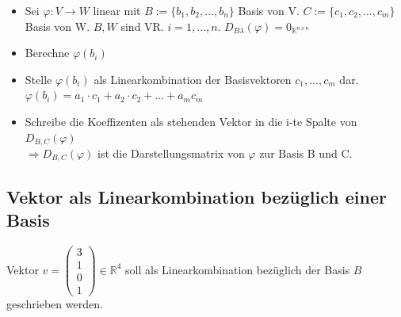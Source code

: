 \documentclass{scrartcl}
\begin{document}
\begin{itemize}
\item Sei $\varphi: V \rightarrow W$ linear mit $B := \{b_1, b_2, \dots, b_n\}$ Basis von V. $C := \{c_1, c_2, \dots, c_m\}$ Basis von W. $B, W$ sind VR. $i = 1, \dots, n$. $D_{B\lambda}(\varphi) = 0_{\mathbb{K}^{n~x~n}}$
\item Berechne $\varphi(b_i)$
\item Stelle $\varphi(b_i)$ als Linearkombination der Basisvektoren $c_1, \dots, c_m$ dar.\\
$\varphi(b_i) = a_1 \cdot c_1 + a_2 \cdot c_2 + \dots + a_m c_m$
\item Schreibe die Koeffizenten als stehenden Vektor in die i-te Spalte von $D_{B,C} (\varphi)$\\
$\Rightarrow D_{B,C} (\varphi)$ ist die Darstellungsmatrix von $\varphi$ zur Basis B und C.
\end{itemize}

\subsection{Vektor als Linearkombination bezüglich einer Basis} \label{Linearkombination}

Vektor $v = \begin{pmatrix} 3 \\ 1 \\ 0\\ 1 \end{pmatrix} \in \mathbb{R}^4$ soll als Linearkombination bezüglich der Basis $B$ geschrieben werden.
\end{document}
